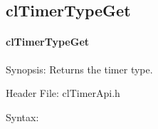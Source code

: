 \begin{flushleft}
\subsection{clTimerTypeGet}
\hypertarget{pagetmr111}{}\paragraph{cl\-Timer\-Type\-Get}\label{pagetmr111}
\begin{Desc}
\item[Synopsis:]Returns the timer type.\end{Desc}
\begin{Desc}
\item[Header File:]clTimerApi.h\end{Desc}
\begin{Desc}
\item[Syntax:]


\end{Desc}
\end{flushleft}
